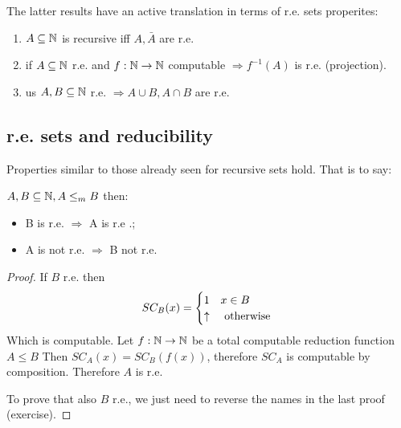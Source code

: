 \begin{observation}
  The latter results have an active translation in terms of r.e. sets
  properites:
  \begin{enumerate}[label=(\arabic*)]
  \item $A \subseteq \mathbb{N}$ is recursive iff $A, \bar{A}$ are r.e.
  \item if $A \subseteq \mathbb{N}$ r.e. and $f : \mathbb{N} \rightarrow \mathbb{N}$ computable
    $\Rightarrow f^{-1}(A)$ is r.e. (projection).
  \item us $A,B \subseteq \mathbb{N}$ r.e. $\Rightarrow A \cup B, A \cap B$
    are r.e.
  \end{enumerate}
\end{observation}

\subsection{r.e. sets and reducibility}

Properties similar to those already seen for recursive sets hold. That
is to say:

\begin{observation}
  $ A,B \subseteq \mathbb{N}, A\leq_m B $ then:
  \begin{itemize}
  \item B is r.e. $ \Rightarrow $ A is r.e .;
  \item A is not r.e. $ \Rightarrow $ B not r.e.
  \end{itemize}
  \begin{proof}
    If $B$ r.e. then
    \begin{equation*}
      SC_B(x) = \begin{cases}
        1 & x \in B \\
        \uparrow & $ otherwise $
      \end{cases}
    \end{equation*}
    Which is computable.  Let $ f:\mathbb{N}\rightarrow\mathbb{N} $ be a total
    computable reduction function\\ $ A\leq B $ Then
    $ SC_A(x) = SC_B(f(x)) $, therefore $ SC_A $ is computable by
    composition.  Therefore $A$ is r.e.

    To prove that also $B$ r.e., we just need to reverse the names in
    the last proof (exercise).
  \end{proof}
\end{observation}